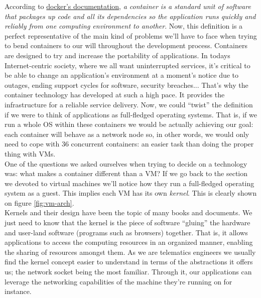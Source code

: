                 According to \href{https://www.docker.com/resources/what-container}{docker's documentation}, \textit{a container is a standard unit of software that packages up code and all its dependencies so the application runs quickly and reliably from one computing environment to another}. Now, this definition is a perfect representative of the main kind of problems we'll have to face when trying to bend containers to our will throughout the development process. Containers are designed to try and increase the portability of applications. In todays Internet-centric society, where we all want uninterrupted services, it's critical to be able to change an application's environment at a moment's notice due to outages, ending support cycles for software, security breaches... That's why the container technology has developed at such a high pace. It provides the infrastructure for a reliable service delivery. Now, we could ``twist'' the definition if we were to think of applications as full-fledged operating systems. That is, if we run a whole OS within these containers we would be actually achieving our goal: each container will behave as a network node so, in other words, we would only need to cope with $36$ concurrent containers: an easier task than doing the proper thing with VMs.\\

                One of the questions we asked ourselves when trying to decide on a technology was: what makes a container different than a VM? If we go back to the section we devoted to virtual machines we'll notice how they run a full-fledged operating system as a guest. This implies each VM has its own \textit{kernel}. This is clearly shown on figure \ref{fig:vm-arch}.\\

                Kernels and their design have been the topic of many books and documents. We just need to know that the kernel is the piece of software ``gluing'' the hardware and user-land software (programs such as browsers) together. That is, it allows applications to access the computing resources in an organized manner, enabling the sharing of resources amongst them. As we are telematics engineers we usually find the kernel concept easier to understand in terms of the abstractions it offers us; the network socket being the most familiar. Through it, our applications can leverage the networking capabilities of the machine they're running on for instance.\\

